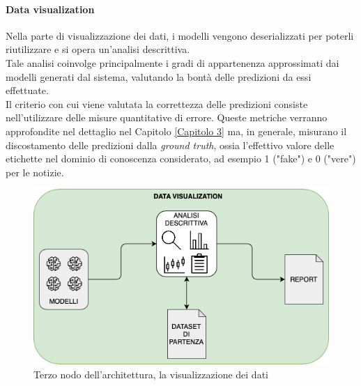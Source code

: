 \documentclass[12pt]{report}
\theoremstyle{definition}
\begin{document}
\paragraph{Data visualization} 
Nella parte di visualizzazione dei dati, i modelli vengono deserializzati per poterli riutilizzare e si opera un'analisi descrittiva.
\\
Tale analisi coinvolge principalmente i gradi di appartenenza approssimati dai modelli generati dal sistema, valutando la bontà delle predizioni da essi effettuate.
\\
Il criterio con cui viene valutata la correttezza delle predizioni consiste nell'utilizzare delle misure quantitative di errore. Queste metriche verranno approfondite nel dettaglio nel Capitolo \ref{Capitolo 3} ma, in generale, misurano il discostamento delle predizioni dalla \textit{ground truth}, ossia l'effettivo valore delle etichette nel dominio di conoscenza considerato, ad esempio 1 ("fake") e 0 ("vere") per le notizie.

\begin{figure}
    \centering
    \includegraphics[scale=0.6]{images/datavisualizationmodule.png}
    \caption{Terzo nodo dell'architettura, la visualizzazione dei dati}
    \label{datavisualization}
\end{figure}
\end{document}
